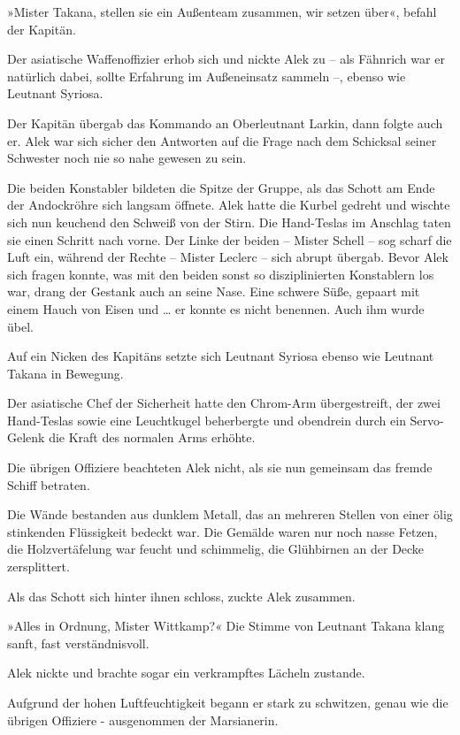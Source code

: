 »Mister Takana, stellen sie ein Außenteam zusammen, wir setzen
über«, befahl der Kapitän.

Der asiatische Waffenoffizier erhob sich und nickte Alek zu – als
Fähnrich war er natürlich dabei, sollte Erfahrung im Außeneinsatz
sammeln –, ebenso wie Leutnant Syriosa.

Der Kapitän übergab das Kommando an Oberleutnant Larkin, dann
folgte auch er. Alek war sich sicher den Antworten auf die Frage
nach dem Schicksal seiner Schwester noch nie so nahe gewesen zu
sein.

\tb

Die beiden Konstabler bildeten die Spitze der Gruppe, als das
Schott am Ende der Andockröhre sich langsam öffnete. Alek hatte die
Kurbel gedreht und wischte sich nun keuchend den Schweiß von der
Stirn. Die Hand-Teslas im Anschlag taten sie einen Schritt nach
vorne. Der Linke der beiden – Mister Schell – sog scharf die Luft
ein, während der Rechte – Mister Leclerc – sich abrupt übergab.
Bevor Alek sich fragen konnte, was mit den beiden sonst so
disziplinierten Konstablern los war, drang der Gestank auch an
seine Nase. Eine schwere Süße, gepaart mit einem Hauch von Eisen
und \ldots{} er konnte es nicht benennen. Auch ihm wurde übel.

Auf ein Nicken des Kapitäns setzte sich Leutnant Syriosa ebenso wie
Leutnant Takana in Bewegung.

Der asiatische Chef der Sicherheit hatte den Chrom-Arm
übergestreift, der zwei Hand-Teslas sowie eine Leuchtkugel
beherbergte und obendrein durch ein Servo-Gelenk die Kraft des
normalen Arms erhöhte.

Die übrigen Offiziere beachteten Alek nicht, als sie nun gemeinsam
das fremde Schiff betraten.

Die Wände bestanden aus dunklem Metall, das an mehreren Stellen von
einer ölig stinkenden Flüssigkeit bedeckt war. Die Gemälde waren
nur noch nasse Fetzen, die Holzvertäfelung war feucht und
schimmelig, die Glühbirnen an der Decke zersplittert.

Als das Schott sich hinter ihnen schloss, zuckte Alek zusammen.

»Alles in Ordnung, Mister Wittkamp?« Die Stimme von Leutnant Takana
klang sanft, fast verständnisvoll.

Alek nickte und brachte sogar ein verkrampftes Lächeln zustande.

Aufgrund der hohen Luftfeuchtigkeit begann er stark zu schwitzen,
genau wie die übrigen Offiziere - ausgenommen der Marsianerin.


